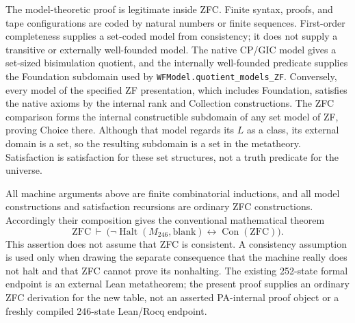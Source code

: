 The model-theoretic proof is legitimate inside ZFC.  Finite syntax, proofs,
and tape configurations are coded by natural numbers or finite sequences.
First-order completeness supplies a set-coded model from consistency; it
does not supply a transitive or externally well-founded model.  The native
CP/GIC model gives a set-sized bisimulation quotient, and the internally
well-founded predicate supplies the Foundation subdomain used by
\texttt{WFModel.quotient\_models\_ZF}.  Conversely, every model of the
specified ZF presentation, which includes Foundation, satisfies the native
axioms by the internal rank and Collection constructions.  The ZFC
comparison forms the internal constructible subdomain of any set model of
ZF, proving Choice there.  Although that model regards its $L$ as a class,
its external domain is a set, so the resulting subdomain is a set in the
metatheory.  Satisfaction is satisfaction for these set structures, not a
truth predicate for the universe.

All machine arguments above are finite combinatorial inductions, and all
model constructions and satisfaction recursions are ordinary ZFC
constructions.  Accordingly their composition gives the conventional
mathematical theorem
\[
 \mathrm{ZFC}\ \vdash\
 \bigl(\neg\operatorname{Halt}(M_{246},\mathrm{blank})
       \longleftrightarrow\operatorname{Con}(\mathrm{ZFC})\bigr).
\]
This assertion does not assume that ZFC is consistent.  A consistency
assumption is used only when drawing the separate consequence that the
machine really does not halt and that ZFC cannot prove its nonhalting.
The existing 252-state formal endpoint is an external Lean metatheorem;
the present proof supplies an ordinary ZFC derivation for the new table,
not an asserted PA-internal proof object or a freshly compiled 246-state
Lean/Rocq endpoint.
